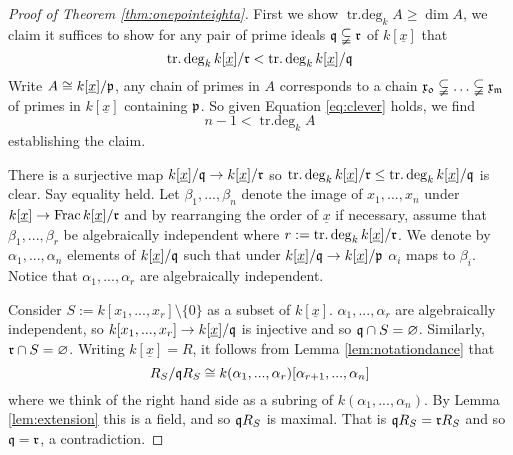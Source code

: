\documentclass[12pt]{article}
\theoremstyle{plain}
\theoremstyle{definition}
\begin{document}
	\begin{proof}[Proof of Theorem \ref{thm:onepointeighta}]
		First we show $\operatorname{tr.deg}_kA \geq \operatorname{dim}A$, we claim it suffices to show for any pair of prime ideals $\frak{q} \subsetneqq \frak{r}$ of $k[\underline{x}]$ that
		\begin{equation}
			\label{eq:clever}
			\operatorname{tr.deg}_kk[\underline{x}]/\frak{r} < \operatorname{tr.deg}_kk[\underline{x}]/\frak{q}
		\end{equation}
		Write $A \cong k[\underline{x}]/\frak{p}$, any chain of primes in $A$ corresponds to a chain $\frak{x_0} \subsetneqq \hdots \subsetneqq \frak{x_m}$ of primes in $k[\underline{x}]$ containing $\frak{p}$. So given Equation \ref{eq:clever} holds, we find
		\[n - 1 < \operatorname{tr.deg}_kA\]
		establishing the claim.
		
		There is a surjective map $k[\underline{x}]/\frak{q} \to k[\underline{x}]/\frak{r}$ so $\operatorname{tr.deg}_kk[\underline{x}]/\frak{r} \leq \operatorname{tr.deg}_kk[\underline{x}]/\frak{q}$ is clear. Say equality held. Let $\beta_1,...,\beta_n$ denote the image of $x_1,...,x_n$ under $k[\underline{x}] \to \operatorname{Frac}k[\underline{x}]/\frak{r}$ and by rearranging the order of $\underline{x}$ if necessary, assume that $\beta_1,...,\beta_r$ be algebraically independent where $r := \operatorname{tr.deg}_kk[\underline{x}]/\frak{r}$. We denote by $\alpha_1,...,\alpha_n$ elements of $k[\underline{x}]/\frak{q}$ such that under $k[\underline{x}]/\frak{q} \to k[\underline{x}]/\frak{p}$ $\alpha_i$ maps to $\beta_i$. Notice that $\alpha_1,...,\alpha_r$ are algebraically independent.
		
		Consider $S := k[x_1,...,x_r]\setminus\lbrace 0 \rbrace$ as a subset of $k[\underline{x}]$. $\alpha_1,...,\alpha_r$ are algebraically independent, so $k[x_1,...,x_r] \to k[\underline{x}]/\frak{q}$ is injective and so $\frak{q} \cap S = \varnothing$. Similarly, $\frak{r} \cap S = \varnothing$. Writing $k[\underline{x}] = R$, it follows from Lemma \ref{lem:notationdance} that
		\[R_S/\frak{q}R_S \cong k(\alpha_1,...,\alpha_r)[\alpha_{r+1},...,\alpha_n]\]
		where we think of the right hand side as a subring of $k(\alpha_1,...,\alpha_n)$. By Lemma \ref{lem:extension} this is a field, and so $\frak{q}R_S$ is maximal. That is $\frak{q}R_S = \frak{r}R_S$ and so $\frak{q} = \frak{r}$, a contradiction.
		

\end{proof}
\end{document}
